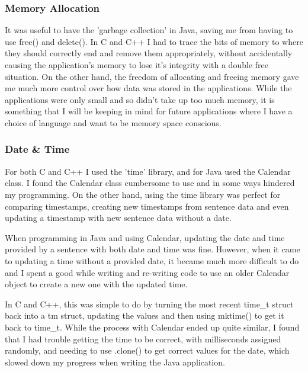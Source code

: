 \documentclass{article}
\begin{document}
\subsubsection{Memory Allocation}

It was useful to have the 'garbage collection' in Java, saving me from having to use free() and delete(). In C and C++ I had to trace the bits of memory to where they should correctly end and remove them appropriately, without accidentally causing the application's memory to lose it's integrity with a double free situation. On the other hand, the freedom of allocating and freeing memory gave me much more control over how data was stored in the applications. While the applications were only small and so didn't take up too much memory, it is something that I will be keeping in mind for future applications where I have a choice of language and want to be memory space conscious.

\subsubsection{Date \& Time}

For both C and C++ I used the 'time' library\cite{ctime}, and for Java used the Calendar\cite{calendar} class. I found the Calendar class cumbersome to use and in some ways hindered my programming. On the other hand, using the time library was perfect for comparing timestamps, creating new timestamps from sentence data and even updating a timestamp with new sentence data without a date. 

When programming in Java and using Calendar, updating the date and time provided by a sentence with both date and time was fine. However, when it came to updating a time without a provided date, it became much more difficult to do and I spent a good while writing and re-writing code to use an older Calendar object to create a new one with the updated time.

In C and C++, this was simple to do by turning the most recent time\_t struct back into a tm struct, updating the values and then using mktime() to get it back to time\_t. While the process with Calendar ended up quite similar, I found that I had trouble getting the time to be correct, with milliseconds assigned randomly, and needing to use .clone() to get correct values for the date, which slowed down my progress when writing the Java application.




\end{document}
